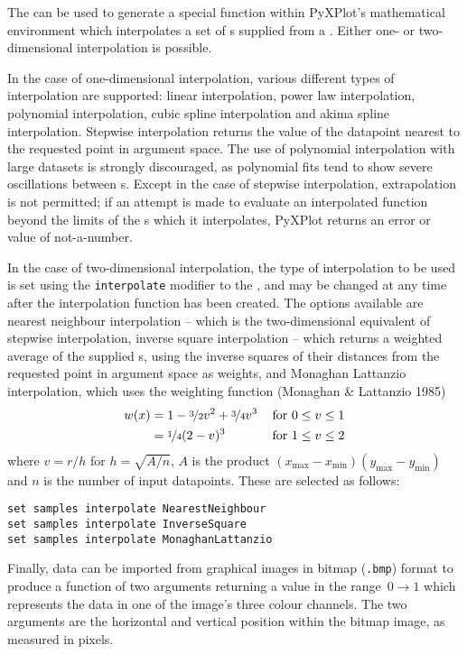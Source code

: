 The  can be used to generate a special function within
PyXPlot's mathematical environment which interpolates a set of \datapoint s
supplied from a \datafile. Either one- or two-dimensional interpolation is
possible.

In the case of one-dimensional interpolation, various different types of
interpolation are supported: linear interpolation, power law interpolation,
polynomial interpolation, cubic spline interpolation and akima spline
interpolation. Stepwise interpolation returns the value of the datapoint
nearest to the requested point in argument space. The use of polynomial
interpolation with large datasets is strongly discouraged, as polynomial fits
tend to show severe oscillations between \datapoint s.  Except in the case of
stepwise interpolation, extrapolation is not permitted; if an attempt is made
to evaluate an interpolated function beyond the limits of the \datapoint s
which it interpolates, PyXPlot returns an error or value of not-a-number.

In the case of two-dimensional interpolation, the type of interpolation to be
used is set using the {\tt interpolate} modifier to the ,
and may be changed at any time after the interpolation function has been
created.  The options available are nearest neighbour interpolation -- which is
the two-dimensional equivalent of stepwise interpolation, inverse square
interpolation -- which returns a weighted average of the supplied \datapoint s,
using the inverse squares of their distances from the requested point in
argument space as weights, and Monaghan Lattanzio interpolation, which uses the
weighting function (Monaghan \& Lattanzio 1985)
\begin{eqnarray*}
w(x) & = 1 - \nicefrac{3}{2}v^2 + \nicefrac{3}{4}v^3 & \,\mathrm{for~}0\leq v\leq 1 \\
     & = \nicefrac{1}{4}(2-v)^3                      & \,\mathrm{for~}1\leq v\leq 2
\end{eqnarray*}
where $v=r/h$ for $h=\sqrt{A/n}$, $A$ is the product
$(x_\mathrm{max}-x_\mathrm{min})(y_\mathrm{max}-y_\mathrm{min})$ and $n$ is the
number of input datapoints. These are selected as follows:

\begin{verbatim}
set samples interpolate NearestNeighbour
set samples interpolate InverseSquare
set samples interpolate MonaghanLattanzio
\end{verbatim}

Finally, data can be imported from graphical images in bitmap ({\tt .bmp}) 
format to produce a function of two arguments returning a value in the
range~$0\to1$ which represents the data in one of the image's three colour
channels. The two arguments are the horizontal and vertical position within the
bitmap image, as measured in pixels.

